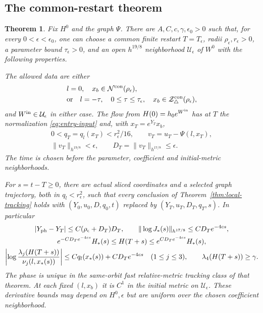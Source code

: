 \documentclass[11pt]{amsart}
\newtheorem{theorem}{Theorem}[section]
\theoremstyle{definition}
\theoremstyle{remark}
\begin{document}
\subsection{The common-restart theorem}
\begin{theorem}\label{thm:prescribed}
Fix $H^0$ and the graph $\Psi$. There are
$A,C,c,\gamma,\epsilon_0>0$ such that, for every
$0<\epsilon<\epsilon_0$, one can choose a common finite
restart $T=T_\epsilon$, radii $\rho_\epsilon,r_\epsilon>0$,
a parameter bound $\tau_\epsilon>0$, and an open
$h^{19/8}$ neighborhood $\mathcal U_\epsilon$ of $W^0$
with the following properties.

The allowed data are either
\begin{equation}\label{eq:prescribed-domains}
 \begin{aligned}
 &l=0,\quad x_b\in\mathcal N^{\rm con}(\rho_\epsilon),\\
 &\text{or}\quad l=-\tau,\quad 0\le\tau\le\tau_\epsilon,\quad
                 x_b\in\mathcal Z_\triangle^{\rm con}(\rho_\epsilon),
 \end{aligned}
\end{equation}
and $W^{\rm in}\in\mathcal U_\epsilon$ in either case.
The flow from $H(0)=h_0e^{W^{\rm in}}$ has at $T$ the
normalization \eqref{eq:entry-input} and, with
$x_T=e^{Y_T}x_b$,
\begin{equation}\label{eq:entry-smallness}
 \begin{gathered}
 0<q_T=q_l(x_T)<r_\epsilon^2/16,\qquad
 v_T=u_T-\Psi(l,x_T),\\
 \|v_T\|_{h^{19/8}}<\epsilon,\qquad
 D_T=\|v_T\|_{h^{17/8}}\le\epsilon .
 \end{gathered}
\end{equation}
The time is chosen before the parameter, coefficient and
initial-metric neighborhoods.

For $s=t-T\ge0$, there are actual sliced coordinates and
a selected graph trajectory, both in $q_l<r_\epsilon^2$,
such that every conclusion of
Theorem~\ref{thm:local-tracking} holds with
$(Y_0,u_0,D,q_0,t)$ replaced by $(Y_T,u_T,D_T,q_T,s)$.
In particular
\begin{equation}\label{eq:prescribed-tracking}
 \begin{gathered}
 |Y_{\rm ph}-Y_T|\le C(\rho_\epsilon+D_T)D_T,\qquad
 \|\log J_*(s)\|_{h^{17/8}}\le CD_Te^{-4cs},\\
 e^{-CD_Te^{-4cs}}H_*(s)\le H(T+s)
                         \le e^{CD_Te^{-4cs}}H_*(s),\\
 \left|\log\frac{\lambda_j(H(T+s))}
                         {\nu_j(l,x_*(s))}\right|
       \le Cq_l(x_*(s))+CD_Te^{-4cs}\quad(1\le j\le3),\qquad
 \lambda_4(H(T+s))\ge\gamma .
 \end{gathered}
\end{equation}
The phase is unique in the same-orbit fast relative-metric
tracking class of that theorem. At each fixed $(l,x_b)$
it is $C^1$ in the initial metric on $\mathcal U_\epsilon$.
These derivative bounds may depend on $H^0,\epsilon$ but
are uniform over the chosen coefficient neighborhood.


\end{theorem}
\end{document}

